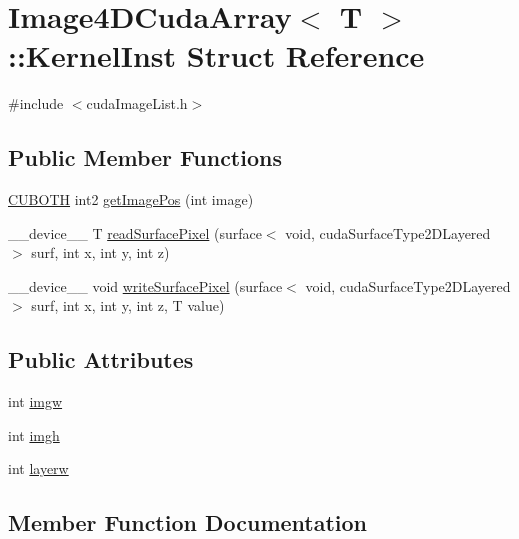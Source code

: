 \hypertarget{struct_image4_d_cuda_array_1_1_kernel_inst}{}\section{Image4\+D\+Cuda\+Array$<$ T $>$\+:\+:Kernel\+Inst Struct Reference}
\label{struct_image4_d_cuda_array_1_1_kernel_inst}


{\ttfamily \#include $<$cuda\+Image\+List.\+h$>$}

\subsection*{Public Member Functions}
\begin{DoxyCompactItemize}
\item 
\hyperlink{gpu__utils_8h_ac50b87a58396e77c6168aa6f3be3c189}{C\+U\+B\+O\+TH} int2 \hyperlink{struct_image4_d_cuda_array_1_1_kernel_inst_a77e0c75976faf9ddbd733b9ff393a7b6}{get\+Image\+Pos} (int image)
\item 
\+\_\+\+\_\+device\+\_\+\+\_\+ T \hyperlink{struct_image4_d_cuda_array_1_1_kernel_inst_a67dd42510494400ec1a5a438ac6fbd6f}{read\+Surface\+Pixel} (surface$<$ void, cuda\+Surface\+Type2\+D\+Layered $>$ surf, int x, int y, int z)
\item 
\+\_\+\+\_\+device\+\_\+\+\_\+ void \hyperlink{struct_image4_d_cuda_array_1_1_kernel_inst_aa1d4d971eaf1d3685fcda6deb9ad7e71}{write\+Surface\+Pixel} (surface$<$ void, cuda\+Surface\+Type2\+D\+Layered $>$ surf, int x, int y, int z, T value)
\end{DoxyCompactItemize}
\subsection*{Public Attributes}
\begin{DoxyCompactItemize}
\item 
int \hyperlink{struct_image4_d_cuda_array_1_1_kernel_inst_aada9791bd402e67c6d9a2dd2e5fa28b5}{imgw}
\item 
int \hyperlink{struct_image4_d_cuda_array_1_1_kernel_inst_a45e62046843a94ac7834849847cafbdc}{imgh}
\item 
int \hyperlink{struct_image4_d_cuda_array_1_1_kernel_inst_aa1264147741eabee6f8fae0b22cbcf28}{layerw}
\end{DoxyCompactItemize}


\subsection{Member Function Documentation}
